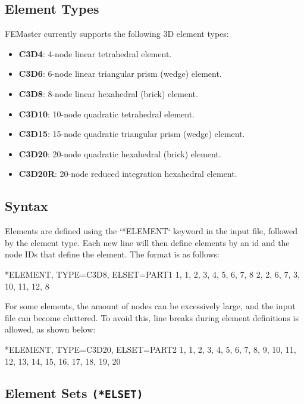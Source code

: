 \subsection{Element Types}

FEMaster currently supports the following 3D element types:
\begin{itemize}
    \item \textbf{C3D4}: 4-node linear tetrahedral element.
    \item \textbf{C3D6}: 6-node linear triangular prism (wedge) element.
    \item \textbf{C3D8}: 8-node linear hexahedral (brick) element.
    \item \textbf{C3D10}: 10-node quadratic tetrahedral element.
    \item \textbf{C3D15}: 15-node quadratic triangular prism (wedge) element.
    \item \textbf{C3D20}: 20-node quadratic hexahedral (brick) element.
    \item \textbf{C3D20R}: 20-node reduced integration hexahedral element.
\end{itemize}

\subsection{Syntax}
Elements are defined using the `*ELEMENT` keyword in the input file,
followed by the element type. Each new line will then define elements by an id and the node IDs that define the element.
 The format is as follows:

\begin{codeBlock}
*ELEMENT, TYPE=C3D8, ELSET=PART1
1, 1, 2, 3, 4, 5, 6, 7, 8
2, 2, 6, 7, 3, 10, 11, 12, 8
\end{codeBlock}

For some elements, the amount of nodes can be excessively large, and the input file can become cluttered.
To avoid this, line breaks during element definitions is allowed, as shown below:

\begin{codeBlock}
*ELEMENT, TYPE=C3D20, ELSET=PART2
1, 1, 2, 3, 4, 5, 6, 7, 8,
   9, 10, 11, 12, 13, 14, 15, 16,
    17, 18, 19, 20
\end{codeBlock}

\subsection{Element Sets \texttt{(*ELSET)}}

